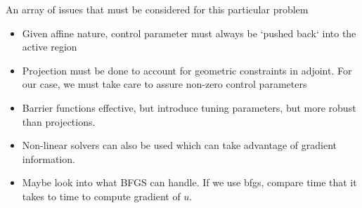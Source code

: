 An array of issues that must be considered for this particular problem

\begin{itemize}
    \item Given affine nature, control parameter must always be `pushed back` into the active region
    \item Projection must be done to account for geometric constraints in adjoint. For our case, we must take care to assure non-zero control parameters
    \item Barrier functions effective, but introduce tuning parameters, but more robust than projections.
    \item Non-linear solvers can also be used which can take advantage of gradient information.
    \item Maybe look into what BFGS can handle. If we use bfgs, compare time that it takes to time to compute gradient of $u$.
\end{itemize}